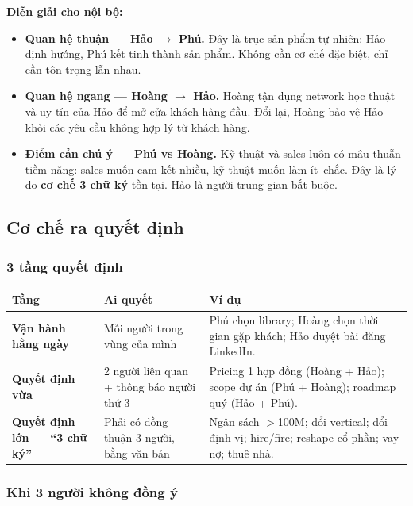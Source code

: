 \documentclass[11pt,a4paper]{article}
\begin{document}
\textbf{Diễn giải cho nội bộ:}

\begin{itemize}
\item \textbf{Quan hệ thuận --- Hảo $\to$ Phú.} Đây là trục sản phẩm tự nhiên:
Hảo định hướng, Phú kết tinh thành sản phẩm. Không cần cơ chế đặc biệt, chỉ cần
tôn trọng lẫn nhau.

\item \textbf{Quan hệ ngang --- Hoàng $\to$ Hảo.} Hoàng tận dụng network học
thuật và uy tín của Hảo để mở cửa khách hàng đầu. Đổi lại, Hoàng bảo vệ Hảo
khỏi các yêu cầu không hợp lý từ khách hàng.

\item \textbf{Điểm cần chú ý --- Phú vs Hoàng.} Kỹ thuật và sales luôn có mâu
thuẫn tiềm năng: sales muốn cam kết nhiều, kỹ thuật muốn làm ít--chắc. Đây là
lý do \textbf{cơ chế 3 chữ ký} tồn tại. Hảo là người trung gian bắt buộc.
\end{itemize}

\subsection{Cơ chế ra quyết định}

\subsubsection*{3 tầng quyết định}

\begin{tabularx}{\linewidth}{@{}p{2.2cm} X X@{}}
\toprule
\textbf{Tầng} & \textbf{Ai quyết} & \textbf{Ví dụ} \\
\midrule
\textbf{Vận hành hằng ngày} & Mỗi người trong vùng của mình & Phú chọn library; Hoàng chọn thời gian gặp khách; Hảo duyệt bài đăng LinkedIn. \\
\textbf{Quyết định vừa} & 2 người liên quan + thông báo người thứ 3 & Pricing 1 hợp đồng (Hoàng + Hảo); scope dự án (Phú + Hoàng); roadmap quý (Hảo + Phú). \\
\textbf{Quyết định lớn --- ``3 chữ ký''} & Phải có đồng thuận 3 người, bằng văn bản & Ngân sách $>$100M; đổi vertical; đổi định vị; hire/fire; reshape cổ phần; vay nợ; thuê nhà. \\
\bottomrule
\end{tabularx}

\subsubsection*{Khi 3 người không đồng ý}
\end{document}
